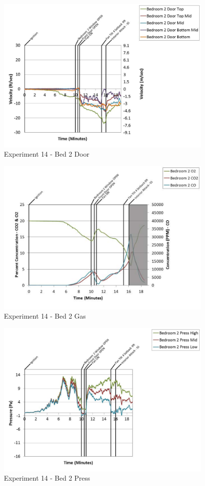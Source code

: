 \documentclass{article}
\begin{document}
\begin{appendices}
	\begin{figure}[h!]
		\centering
		\includegraphics[height=3.05in]{0_Images/Results_Charts/Exp_14_Charts/Bed2Door.pdf}
		\caption{Experiment 14 - Bed 2 Door}
	\end{figure}
 
	\clearpage

	\begin{figure}[h!]
		\centering
		\includegraphics[height=3.05in]{0_Images/Results_Charts/Exp_14_Charts/Bed2Gas.pdf}
		\caption{Experiment 14 - Bed 2 Gas}
	\end{figure}
 

	\begin{figure}[h!]
		\centering
		\includegraphics[height=3.05in]{0_Images/Results_Charts/Exp_14_Charts/Bed2Press.pdf}
		\caption{Experiment 14 - Bed 2 Press}
	\end{figure}
 

\end{appendices}
\end{document}
